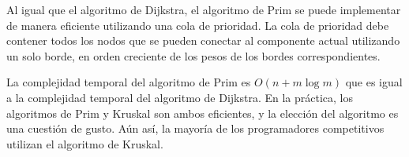 Al igual que el algoritmo de Dijkstra, el algoritmo de Prim se puede
implementar de manera eficiente utilizando una cola de prioridad.
La cola de prioridad debe contener todos los nodos
que se pueden conectar al componente actual utilizando
un solo borde, en orden creciente de los pesos
de los bordes correspondientes.

La complejidad temporal del algoritmo de Prim es
$O(n + m \log m)$ que es igual a la complejidad temporal
del algoritmo de Dijkstra.
En la práctica, los algoritmos de Prim y Kruskal
son ambos eficientes, y la elección del algoritmo
es una cuestión de gusto.
Aún así, la mayoría de los programadores competitivos utilizan el algoritmo de Kruskal. 
